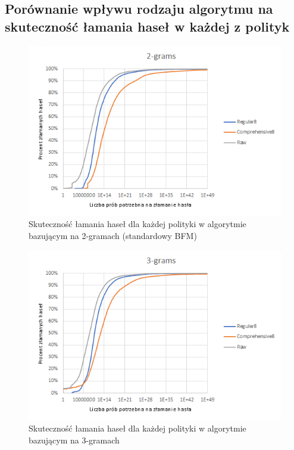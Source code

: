\documentclass{article}
\begin{document}
	\subsection{Porównanie wpływu rodzaju algorytmu na skuteczność łamania haseł w każdej z polityk}
	\begin{figure}[H]
		\centering
		\includegraphics{2grams}
		\caption{Skuteczność łamania haseł dla każdej polityki w algorytmie bazującym na 2-gramach (standardowy BFM)}
	\end{figure}

	\begin{figure}[H]
		\centering
		\includegraphics{3grams}
		\caption{Skuteczność łamania haseł dla każdej polityki w algorytmie bazującym na 3-gramach}
	\end{figure}
\end{document}
